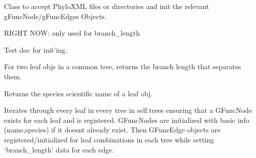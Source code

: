 \documentclass[letterpaper,10pt,english]{sphinxmanual}
\begin{document}
\begin{fulllineitems}
\label{code:gfunc.parsers.ETE.PhyloXMLParser}
Class to accept PhyloXML files or directories and init the relevant gFuncNode/gFuncEdges Objects.

RIGHT NOW: only used for branch\_length

\begin{fulllineitems}
\label{code:gfunc.parsers.ETE.PhyloXMLParser.__init__}
Test doc for init'ing.

\end{fulllineitems}


\begin{fulllineitems}
\label{code:gfunc.parsers.ETE.PhyloXMLParser.get_distance}
For two leaf objs in a common tree, returns the branch length that
separates them.

\end{fulllineitems}


\begin{fulllineitems}
\label{code:gfunc.parsers.ETE.PhyloXMLParser.get_species}
Returns the species scientific name of a leaf obj.

\end{fulllineitems}


\begin{fulllineitems}
\label{code:gfunc.parsers.ETE.PhyloXMLParser.resgister_nodes_and_edges}
Iterates through every leaf in every tree in self.trees ensuring that
a GFuncNode exists for each leaf and is registered.  GFuncNodes are
initialized with basic info (name,species) if it doesnt already exist.
Then GFuncEdge objects are registered/initialized for leaf combinations
in each tree while setting `branch\_length' data for each edge.

\end{fulllineitems}


\end{fulllineitems}
\end{document}
